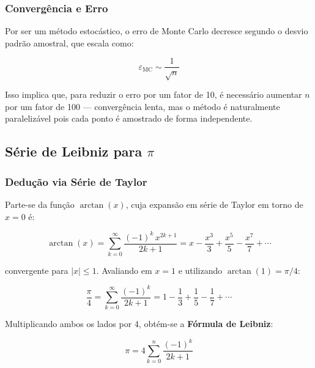 \documentclass[12pt, a4paper]{article}
\begin{document}
	\subsubsection{Convergência e Erro}
	
	Por ser um método estocástico, o erro de Monte Carlo decresce segundo o desvio
	padrão amostral, que escala como:
	
	\begin{equation}
		\varepsilon_{\text{MC}} \sim \frac{1}{\sqrt{n}}
		\label{eq:erro_mc}
	\end{equation}
	
	\noindent Isso implica que, para reduzir o erro por um fator de 10, é necessário
	aumentar $n$ por um fator de 100 — convergência lenta, mas o método é
	naturalmente paralelizável pois cada ponto é amostrado de forma independente.
	
	\subsection{Série de Leibniz para $\pi$}
	
	\subsubsection{Dedução via Série de Taylor}
	
	Parte-se da função $\arctan(x)$, cuja expansão em série de Taylor em torno de
	$x = 0$ é:
	
	\begin{equation}
		\arctan(x) = \sum_{k=0}^{\infty} \frac{(-1)^k \, x^{2k+1}}{2k+1}
		= x - \frac{x^3}{3} + \frac{x^5}{5} - \frac{x^7}{7} + \cdots
		\label{eq:taylor_arctan}
	\end{equation}
	
	\noindent convergente para $|x| \leq 1$. Avaliando em $x = 1$ e utilizando
	$\arctan(1) = \pi/4$:
	
	\begin{equation}
		\frac{\pi}{4} = \sum_{k=0}^{\infty} \frac{(-1)^k}{2k+1}
		= 1 - \frac{1}{3} + \frac{1}{5} - \frac{1}{7} + \cdots
		\label{eq:leibniz_quarto}
	\end{equation}
	
	Multiplicando ambos os lados por 4, obtém-se a \textbf{Fórmula de Leibniz}:
	
	\begin{equation}
		\boxed{\pi = 4 \sum_{k=0}^{n} \frac{(-1)^k}{2k+1}}
		\label{eq:leibniz}
	\end{equation}
	
\end{document}
